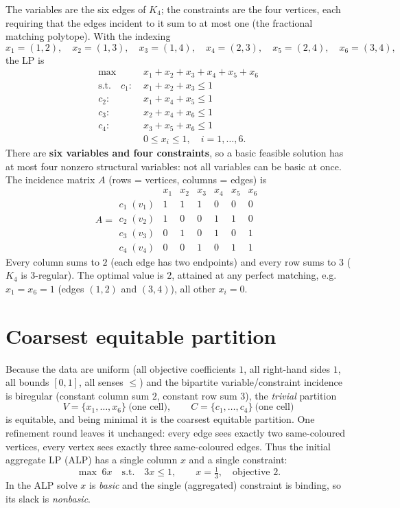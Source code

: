 \documentclass[11pt]{article}
\begin{document}
The variables are the six edges of $K_4$; the constraints are the four vertices,
each requiring that the edges incident to it sum to at most one (the fractional
matching polytope). With the indexing
\[
x_1=(1,2),\quad x_2=(1,3),\quad x_3=(1,4),\quad
x_4=(2,3),\quad x_5=(2,4),\quad x_6=(3,4),
\]
the LP is
\[
\begin{aligned}
\max\quad & x_1+x_2+x_3+x_4+x_5+x_6\\
\text{s.t.}\quad
c_1:\;& x_1+x_2+x_3 \le 1\\
c_2:\;& x_1+x_4+x_5 \le 1\\
c_3:\;& x_2+x_4+x_6 \le 1\\
c_4:\;& x_3+x_5+x_6 \le 1\\
& 0\le x_i\le 1,\quad i=1,\dots,6.
\end{aligned}
\]
There are \textbf{six variables and four constraints}, so a basic feasible
solution has at most four nonzero structural variables: not all variables can be
basic at once. The incidence matrix $A$ (rows = vertices, columns = edges) is
\[
A=
\begin{array}{c|cccccc}
       & x_1 & x_2 & x_3 & x_4 & x_5 & x_6\\\hline
c_1\;(v_1) & 1 & 1 & 1 & 0 & 0 & 0\\
c_2\;(v_2) & 1 & 0 & 0 & 1 & 1 & 0\\
c_3\;(v_3) & 0 & 1 & 0 & 1 & 0 & 1\\
c_4\;(v_4) & 0 & 0 & 1 & 0 & 1 & 1
\end{array}
\]
Every column sums to $2$ (each edge has two endpoints) and every row sums to $3$
($K_4$ is $3$-regular). The optimal value is $2$, attained at any perfect
matching, e.g. $x_1=x_6=1$ (edges $(1,2)$ and $(3,4)$), all other $x_i=0$.

\section{Coarsest equitable partition}

Because the data are uniform (all objective coefficients $1$, all right-hand
sides $1$, all bounds $[0,1]$, all senses $\le$) and the bipartite
variable/constraint incidence is biregular (constant column sum $2$, constant row
sum $3$), the \emph{trivial} partition
\[
V=\{x_1,\dots,x_6\}\ \text{(one cell)},\qquad
C=\{c_1,\dots,c_4\}\ \text{(one cell)}
\]
is equitable, and being minimal it is the coarsest equitable partition. One
refinement round leaves it unchanged: every edge sees exactly two same-coloured
vertices, every vertex sees exactly three same-coloured edges. Thus the initial
aggregate LP (ALP) has a single column $x$ and a single constraint:
\[
\max\;6x \quad\text{s.t.}\quad 3x\le 1,\qquad x=\tfrac13,\quad \text{objective }2 .
\]
In the ALP solve $x$ is \emph{basic} and the single (aggregated) constraint is
binding, so its slack is \emph{nonbasic}.
\end{document}

